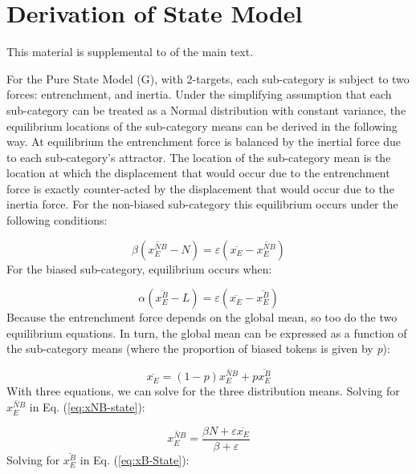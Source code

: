 \chapter{\label{chap:Appendix C}Derivation of State Model}

This material is supplemental to 
of the main text.

For the Pure State Model (G), with 2-targets, each sub-category is
subject to two forces: entrenchment, and inertia. Under the simplifying
assumption that each sub-category can be treated as a Normal distribution
with constant variance, the equilibrium locations of the sub-category
means can be derived in the following way. At equilibrium the entrenchment
force is balanced by the inertial force due to each sub-category's
attractor. The location of the sub-category mean is the location at
which the displacement that would occur due to the entrenchment force
is exactly counter-acted by the displacement that would occur due
to the inertia force. For the non-biased sub-category this equilibrium
occurs under the following conditions:

\begin{equation}
\beta(\overline{x_{E}^{NB}}-N)=\varepsilon(\overline{x_{E}}-\overline{x_{E}^{NB}})\label{eq:xNB-state}
\end{equation}
For the biased sub-category, equilibrium occurs when:

\begin{equation}
\alpha(\overline{x_{E}^{B}}-L)=\varepsilon(\overline{x_{E}}-\overline{x_{E}^{B}})\label{eq:xB-State}
\end{equation}
Because the entrenchment force depends on the global mean, so too
do the two equilibrium equations. In turn, the global mean can be
expressed as a function of the sub-category means (where the proportion
of biased tokens is given by \emph{p}): 

\begin{equation}
\overline{x_{E}}=(1-p)\overline{x_{E}^{NB}}+p\overline{x_{E}^{B}}\label{eq:weighted-means}
\end{equation}
With three equations, we can solve for the three distribution means.
Solving for $\overline{x_{E}^{NB}}$ in Eq. (\ref{eq:xNB-state}):

\begin{equation}
\overline{x_{E}^{NB}}=\frac{\beta N+\varepsilon\overline{x_{E}}}{\beta+\varepsilon}
\end{equation}
Solving for $\overline{x_{E}^{B}}$ in Eq. (\ref{eq:xB-State}):

